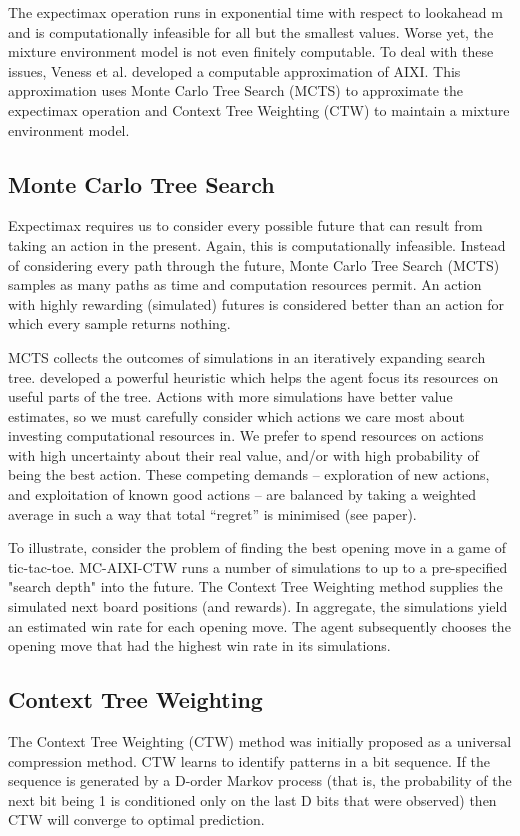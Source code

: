 \documentclass{article}
\theoremstyle{definition}
\newtheorem{primary statistics}[definition]{Primary Statistics}
\newtheorem{auxiliary statistics}[definition]{Auxiliary Statistics}
\begin{document}
The expectimax operation runs in exponential time with respect to lookahead m and is computationally infeasible for all but the smallest values. Worse yet, the mixture environment model is not even finitely computable. To deal with these issues, Veness et al. developed a computable approximation of AIXI. This approximation uses Monte Carlo Tree Search (MCTS) to approximate the expectimax operation and Context Tree Weighting (CTW) to maintain a mixture environment model. 

\subsection{Monte Carlo Tree Search}
Expectimax requires us to consider every possible future that can result from taking an action in the present. Again, this is computationally infeasible. Instead of considering every path through the future, Monte Carlo Tree Search (MCTS) samples as many paths as time and computation resources permit. An action with highly rewarding (simulated) futures is considered better than an action for which every sample returns nothing.

MCTS collects the outcomes of simulations in an iteratively expanding search tree.  \citep{kocsis2006bandit} developed a powerful heuristic which helps the agent focus its resources on useful parts of the tree. Actions with more simulations have better value estimates, so we must carefully consider which actions we care most about investing computational resources in. We prefer to spend resources on actions with high uncertainty about their real value, and/or with high probability of being the best action. These competing demands -- exploration of new actions, and exploitation of known good actions -- are balanced by taking a weighted average in such a way that total “regret” is minimised (see paper).

To illustrate, consider the problem of finding the best opening move in a game of tic-tac-toe. MC-AIXI-CTW runs a number of simulations to up to a pre-specified "search depth" into the future. The Context Tree Weighting method supplies the simulated next board positions (and rewards). In aggregate, the simulations yield an estimated win rate for each opening move. The agent subsequently chooses the opening move that had the highest win rate in its simulations.

\subsection{Context Tree Weighting}
The Context Tree Weighting (CTW) method was initially proposed as a universal compression method. CTW learns to identify patterns in a bit sequence. If the sequence is generated by a D-order Markov process (that is, the probability of the next bit being 1 is conditioned only on the last D bits that were observed) then CTW will converge to optimal prediction. 
\end{document}
